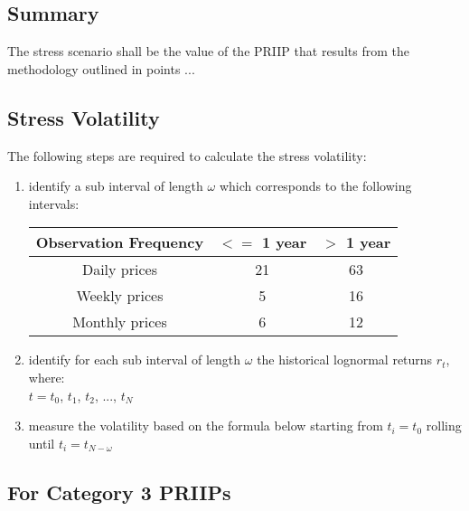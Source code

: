\subsection{Summary}
The stress scenario shall be the value of the PRIIP that results from the methodology outlined in points ...\\

\subsection{Stress Volatility}
The following steps are required to calculate the stress volatility:
\begin{enumerate}
	\item identify a sub interval of length $\omega$ which corresponds to the following intervals:
	\begin{center}
		\begin{longtable}{| c | c | c|}
			\hline
			\textbf{Observation Frequency} & $<=$\textbf{ 1 year} & $> $ \textbf{ 1 year}\\
			\hline
			Daily prices & 21 & 63\\
			\hline
			Weekly prices & 5 & 16\\
			\hline
			Monthly prices & 6 & 12\\
			\hline
		\end{longtable}
	\end{center}
	\item identify for each sub interval of length $\omega$ the historical lognormal returns $r_{t}$,\\
	where:\\
	$t = t_{0}$, $t_{1}$, $t_{2}$, ..., $t_{N}$ 
	\item measure the volatility based on the formula below starting from $t_{i} = t_{0}$ rolling until $t_{i} = t_{N - \omega}$
\end{enumerate}

\subsection{For Category 3 PRIIPs} 


